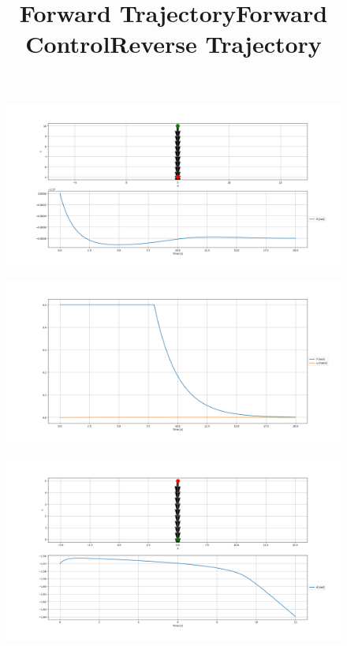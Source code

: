 \documentclass[12pt]{article}
\begin{document}
\begin{enumerate}
	\begin{figure}[H]
		\centering
		\title{\bf Forward Trajectory}
		\includegraphics[width=\textwidth]{../Figures/hw1_3_ii_a_forward.png}
	\end{figure}
	\begin{figure}[H]
		\centering
		\title{\bf Forward Control}
		\includegraphics[width=\textwidth]{../Figures/hw1_3_ii_b_forward.png}
	\end{figure}
	\begin{figure}[H]
		\centering
		\title{\bf Reverse Trajectory}
		\includegraphics[width=\textwidth]{../Figures/hw1_3_ii_a_reverse.png}
	\end{figure}

\end{enumerate}
\end{document}
